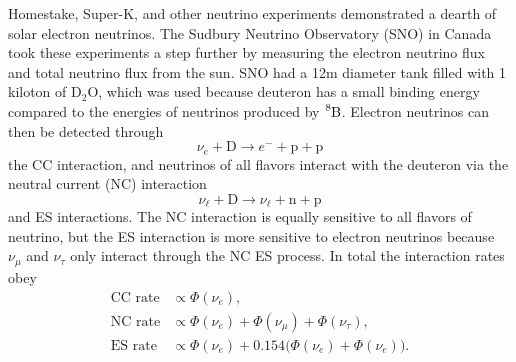 Homestake, Super-K, and other neutrino experiments demonstrated
a dearth of solar electron neutrinos. The Sudbury Neutrino Observatory (SNO)
in Canada took these experiments a step further by measuring the
electron neutrino flux and total neutrino flux from the sun. SNO had a 12m
diameter tank filled with 1 kiloton of $\text{D}_2\text{O}$, which was used
because deuteron has a small binding energy compared to the energies of
neutrinos produced by $\ce{^8B}$. Electron neutrinos can then
be detected through
\begin{equation}
  \nu_e+\text{D}\to e^-+\text{p}+\text{p}
\end{equation}
the CC interaction, and neutrinos of all flavors
interact with the deuteron via the neutral current (NC) interaction
\begin{equation}
 \nu_\ell+\text{D}\to\nu_\ell+\text{n}+\text{p}
\end{equation} 
and ES interactions. The NC
interaction is equally sensitive to all flavors of neutrino, but the ES
interaction is more sensitive to electron neutrinos because $\nu_\mu$ and
$\nu_\tau$ only interact through the NC ES process. In total the interaction
rates obey
\begin{equation}
  \begin{aligned}
    \text{CC rate}&\propto\Phi(\nu_e), \\
    \text{NC rate}&\propto\Phi(\nu_e)+\Phi(\nu_\mu)+\Phi(\nu_\tau), \\
    \text{ES rate}&\propto\Phi(\nu_e)+0.154\big(\Phi(\nu_e)+\Phi(\nu_e)\big).
  \end{aligned}
\end{equation}

